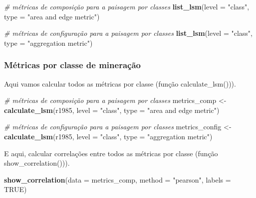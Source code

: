 \documentclass[
]{article}
\newenvironment{Shaded}{\begin{snugshade}}{\end{snugshade}}
\newcommand{\AttributeTok}[1]{\textcolor[rgb]{0.13,0.29,0.53}{#1}}
\newcommand{\CommentTok}[1]{\textcolor[rgb]{0.56,0.35,0.01}{\textit{#1}}}
\newcommand{\ConstantTok}[1]{\textcolor[rgb]{0.56,0.35,0.01}{#1}}
\newcommand{\FunctionTok}[1]{\textcolor[rgb]{0.13,0.29,0.53}{\textbf{#1}}}
\newcommand{\NormalTok}[1]{#1}
\newcommand{\OtherTok}[1]{\textcolor[rgb]{0.56,0.35,0.01}{#1}}
\newcommand{\StringTok}[1]{\textcolor[rgb]{0.31,0.60,0.02}{#1}}
\begin{document}
\begin{Shaded}
\begin{Highlighting}[]
\CommentTok{\# métricas de composição para a paisagem por classes}
\FunctionTok{list\_lsm}\NormalTok{(}\AttributeTok{level =} \StringTok{"class"}\NormalTok{, }\AttributeTok{type =} \StringTok{"area and edge metric"}\NormalTok{)}

\CommentTok{\# métricas de configuração para a paisagem por classes}
\FunctionTok{list\_lsm}\NormalTok{(}\AttributeTok{level =} \StringTok{"class"}\NormalTok{, }\AttributeTok{type =} \StringTok{"aggregation metric"}\NormalTok{)}
\end{Highlighting}
\end{Shaded}

\hypertarget{muxe9tricas-por-classe-de-minerauxe7uxe3o}{%
\subsubsection{Métricas por classe de mineração}\label{muxe9tricas-por-classe-de-minerauxe7uxe3o}}

Aqui vamos calcular todos as métricas por classe (função calculate\_lsm())).

\begin{Shaded}
\begin{Highlighting}[]
\CommentTok{\# métricas de composição para a paisagem por classes}
\NormalTok{metrics\_comp }\OtherTok{\textless{}{-}} \FunctionTok{calculate\_lsm}\NormalTok{(r1985, }\AttributeTok{level =} \StringTok{"class"}\NormalTok{, }\AttributeTok{type =} \StringTok{"area and edge metric"}\NormalTok{)}

\CommentTok{\# métricas de configuração para a paisagem por classes}
\NormalTok{metrics\_config }\OtherTok{\textless{}{-}} \FunctionTok{calculate\_lsm}\NormalTok{(r1985, }\AttributeTok{level =} \StringTok{"class"}\NormalTok{, }\AttributeTok{type =} \StringTok{"aggregation metric"}\NormalTok{)}
\end{Highlighting}
\end{Shaded}

E aqui, calcular correlações entre todos as métricas por classe
(função show\_correlation())).

\begin{Shaded}
\begin{Highlighting}[]
\FunctionTok{show\_correlation}\NormalTok{(}\AttributeTok{data =}\NormalTok{ metrics\_comp, }\AttributeTok{method =} \StringTok{"pearson"}\NormalTok{, }\AttributeTok{labels =} \ConstantTok{TRUE}\NormalTok{)}
\end{Highlighting}
\end{Shaded}
\end{document}
